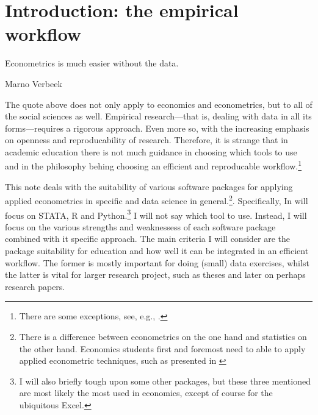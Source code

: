 \documentclass[fleqn,10pt]{SelfArx} %
\affiliation{\textsuperscript{1}\textit{Department of Spatial Economics, Vrije Universiteit Amsterdam, Amsterdam, The Netherlands}} %
\affiliation{*\textbf{Corresponding author}: \Letter{} t.de.graaff@vu.nl; \Mundus{} \href{thomasdegraaff.nl}{thomasdegraaff.nl}} %
\begin{document}
\flushbottom %
\maketitle %
\thispagestyle{empty} %


\section*{Introduction: the empirical workflow} %

\epigraph{Econometrics is much easier without the data.}{Marno Verbeek}

The quote above does not only apply to economics and econometrics, but to all of
the social sciences as well. Empirical research---that is, dealing with data in
all its forms---requires a rigorous approach. Even more so, with the increasing
emphasis on openness and reproducability of research. Therefore, it is strange
that in academic education there is not much guidance in choosing which tools to
use and in the philosophy behing choosing an efficient and reproducable
workflow.\footnote{There are some exceptions, see, e.g.,
  \citet{healy2011choosing}.}

This note deals with the suitability of various software packages for applying
applied econometrics in specific and data science in general.\footnote{There
  is a difference between econometrics on the one hand and statistics on the
  other hand. Economics students first and foremost need to able to apply
  applied econometric techniques, such as presented in
  \citet{angrist2008mostly}}.
Specifically, In will focus on STATA, R and Python.\footnote{I will also briefly
  tough upon some other packages, but these three mentioned are most likely the
  most used in economics, except of course for the ubiquitous Excel.}
I will not say which tool to use. Instead, I will focus on the various strengths
and weaknessess of each software package combined with it specific approach. The
main criteria I will consider are the package suitability for education and how
well it can be integrated in an efficient workflow. The former is mostly
important for doing (small) data exercises, whilst the latter is vital for
larger research project, such as theses and later on perhaps research papers.  
\end{document}

